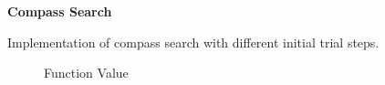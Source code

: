 \textbf{Compass Search}

Implementation of compass search with different initial trial steps.

\begin{figure}
\centering

\caption{Function Value}
\end{figure}
